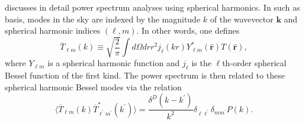 \documentclass[twocolumn,apj,numberedappendix]{emulateapj}
\renewcommand\[{\begin{equation}}
\renewcommand\]{\end{equation}}
\begin{document}
\cite{sphere} discusses in detail power spectrum analyses using spherical harmonics. In such as basis, modes in the sky are indexed by the magnitude $k$ of the wavevector $\mathbf{k}$ and spherical harmonic indices $(\ell, m)$. In other words, one defines
\begin{equation}
\overline{T}_{\ell m} (k) \equiv \sqrt{\frac{2}{\pi}} \int d\Omega dr r^2 j_\ell (kr) Y_{\ell m}^* (\hat{\mathbf{r}}) T (\hat{\mathbf{r}}),
\end{equation}
where $Y_{\ell m}$ is a spherical harmonic function and $j_\ell$ is the $\ell$th-order spherical Bessel function of the first kind. The power spectrum is then related to these spherical harmonic Bessel modes via the relation
\begin{equation}
\label{eq:SHB}
\langle \overline{T}_{\ell m} (k) \overline{T}_{\ell^\prime m^\prime}^* (k^\prime) \rangle = \frac{\delta^D (k - k^\prime)}{k^2} \delta_{\ell \ell^\prime} \delta_{m m^\prime} P(k).
\end{equation}
\end{document}
